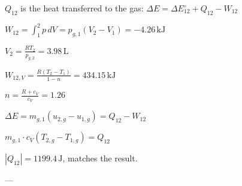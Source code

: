 \( Q_{12} \) is the heat transferred to the gas:
\( \Delta E = \Delta E_{12}^{\circ} + Q_{12} - W_{12} \)

\( W_{12} = \int_{1}^{2} p \, dV = p_{g,1} (V_{2} - V_{1}) = -4.26 \, \text{kJ} \)

\( V_{2} = \frac{R T_{2}}{p_{g,2}} = 3.98 \, \text{L} \)

\( W_{12,V} = \frac{R (T_{2} - T_{1})}{1 - n} = 434.15 \, \text{kJ} \)

\( n = \frac{R + c_{V}}{c_{V}} = 1.26 \)

\( \Delta E = m_{g,1} (u_{2,g} - u_{1,g}) = Q_{12} - W_{12} \)

\( m_{g,1} \cdot c_{V} (T_{2,g} - T_{1,g}) = Q_{12} \)

\( |Q_{12}| = 1199.4 \, \text{J} \), matches the result.

---